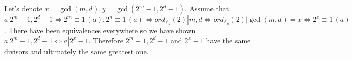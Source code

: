 \documentclass[12pt, a4paper]{article}
\begin{document}
Let's denote $x = \gcd(m,d), y = \gcd(2^m-1, 2^d-1)$. Assume that $a | 2^m-1, 2^d-1 \iff 2^m \equiv 1 \, (a), 2^n \equiv 1 \, (a) \iff ord_{\mathbb{Z}_a}(2)|m,d \iff ord_{\mathbb{Z}_a}(2)|\gcd(m,d)=x \iff 2^x \equiv 1 \, (a)$. There have been equivalences everywhere so we have shown $a | 2^m-1, 2^d-1 \iff a | 2^x-1$. Therefore $ 2^m-1, 2^d-1$ and $2^x-1$ have the same divisors and ultimately the same greatest one.
\end{document}

